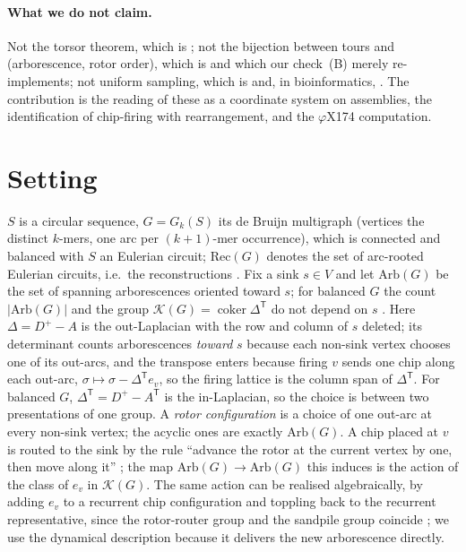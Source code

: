 \documentclass[11pt]{article}
\theoremstyle{plain}
\theoremstyle{definition}
\theoremstyle{remark}
\newcommand{\K}{\mathcal{K}}
\newcommand{\Arb}{\mathrm{Arb}}
\newcommand{\Rec}{\mathrm{Rec}}
\newcommand{\coker}{\operatorname{coker}}
\begin{document}
\paragraph{What we do not claim.} Not the torsor theorem, which is \cite[\S3]{HLMPPW}; not
the bijection between tours and (arborescence, rotor order), which is \cite[Cor.~4.10]{HLMPPW}
and which our check~(B) merely re-implements; not uniform sampling, which is
\cite{CMN,PW,CC} and, in bioinformatics, \cite{AE,KMUW,uShuffle}. The contribution is the
reading of these as a coordinate system on assemblies, the identification of chip-firing
with rearrangement, and the $\varphi$X174 computation.

\section{Setting}\label{sec:setting}

$S$ is a circular sequence, $G=G_k(S)$ its de Bruijn multigraph (vertices the distinct
$k$-mers, one arc per $(k{+}1)$-mer occurrence), which is connected and balanced with $S$
an Eulerian circuit; $\Rec(G)$ denotes the set of arc-rooted Eulerian circuits, i.e.\ the
reconstructions \cite[Rem.~1]{Bio1}. Fix a sink $s\in V$ and let $\Arb(G)$ be the set of
spanning arborescences oriented toward $s$; for balanced $G$ the count $|\Arb(G)|$ and the
group $\K(G)=\coker\Delta^{\mathsf T}$ do not depend on $s$ \cite[Lem.~4.12]{HLMPPW}.
Here $\Delta=D^{+}-A$ is the out-Laplacian with the row and column of $s$ deleted; its
determinant counts arborescences \emph{toward} $s$ because each non-sink vertex chooses
one of its out-arcs, and the transpose enters because firing $v$ sends one chip along
each out-arc, $\sigma\mapsto\sigma-\Delta^{\mathsf T}e_v$, so the firing lattice is the
column span of $\Delta^{\mathsf T}$. For balanced $G$, $\Delta^{\mathsf T}=D^{+}-A^{\mathsf T}$
is the in-Laplacian, so the choice is between two presentations of one group. A
\emph{rotor configuration} is a choice of one out-arc at every non-sink vertex; the
acyclic ones are exactly $\Arb(G)$. A chip placed at $v$ is routed to the sink by the
rule ``advance the rotor at the current vertex by one, then move along it''
\cite[\S3]{HLMPPW}; the map $\Arb(G)\to\Arb(G)$ this induces is the action of the class of
$e_v$ in $\K(G)$. The same action can be realised algebraically, by adding $e_v$ to a
recurrent chip configuration and toppling back to the recurrent representative, since
the rotor-router group and the sandpile group coincide \cite[Lem.~3.19]{HLMPPW}; we use
the dynamical description because it delivers the new arborescence directly.
\end{document}
